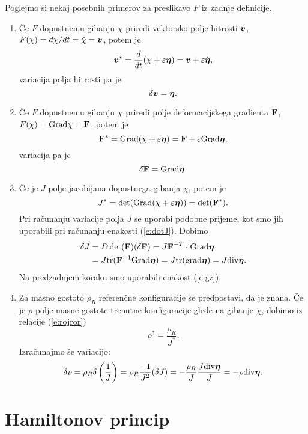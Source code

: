 \begin{primeri}
	Poglejmo si nekaj posebnih primerov za preslikavo $F$ iz zadnje definicije.
	\begin{enumerate}
		\item
			Če $F$ dopustnemu gibanju $\chi$ priredi vektorsko polje hitrosti $\boldsymbol v$,
			$F(\chi)=d\chi/dt=\dot{\chi}=\boldsymbol v$, potem je
			\[ \boldsymbol v^*=\frac{d}{dt}(\chi+\varepsilon\boldsymbol \eta)=\boldsymbol v+\varepsilon\dot{\boldsymbol \eta}, \]
			variacija polja hitrosti pa je
			\[ \delta\boldsymbol v=\dot{\boldsymbol \eta}. \]
		\item
			Če $F$ dopustnemu gibanju $\chi$ priredi polje deformacijskega gradienta $\mathbf F$,
			$F(\chi)=\mathrm{Grad}{\chi}=\mathbf F$, potem je
			\[ \mathbf F^*=\mathrm{Grad}(\chi+\varepsilon\boldsymbol \eta)=\mathbf F+\varepsilon\mathrm{Grad}\boldsymbol \eta, \]
			variacija pa je
			\[ \delta\mathbf F=\mathrm{Grad}\boldsymbol \eta. \]
		\item
			Če je $J$ polje jacobijana dopustnega gibanja $\chi$, potem je
			\[ J^*=\det(\mathrm{Grad}(\chi+\varepsilon\boldsymbol \eta))=\det(\mathbf F^*). \]
			Pri računanju variacije polja $J$ se uporabi podobne prijeme,
			kot smo jih uporabili pri računanju enakosti (\ref{e:dotJ}). Dobimo
			\begin{align*}
				\delta J&=D\det(\mathbf F)(\delta\mathbf F)=J\mathbf F^{-T}\cdot\mathrm{Grad}\boldsymbol \eta\\
				&=J\mathrm{tr}(\mathbf F^{-1}\mathrm{Grad}\boldsymbol \eta)=J\mathrm{tr}(\mathrm{grad}\boldsymbol \eta)=J\mathrm{div}\boldsymbol \eta.
			\end{align*}
			Na predzadnjem koraku smo uporabili enakost (\ref{e:gz}).
		\item
			Za masno gostoto $\rho_R$ referenčne konfiguracije se predpostavi, da je znana. Če je
			$\rho$ polje masne gostote trenutne konfiguracije glede na gibanje $\chi$,
			dobimo iz relacije (\ref{e:rojror})
			\[ \rho^*=\frac{\rho_R}{J^*}. \]
			Izračunajmo še variacijo:
			\begin{equation} \label{e:deltarho}
				\delta\rho=\rho_R\delta\left(\frac{1}{J}\right)=
				\rho_R\frac{-1}{J^2}(\delta J)=-\frac{\rho_R}{J}\frac{J\mathrm{div}\boldsymbol \eta}{J}=-\rho\mathrm{div}\boldsymbol \eta.
			\end{equation}
	\end{enumerate}
\end{primeri}


\section{Hamiltonov princip}


